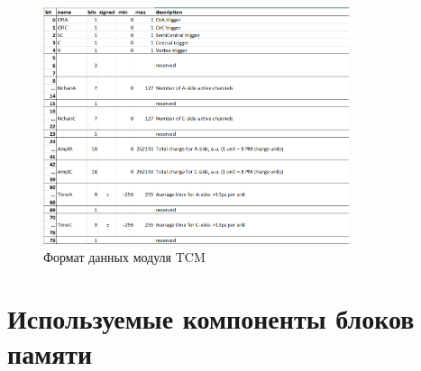 \documentclass{article}
\begin{document}
\begin{figure}[H]
	\centering 
	\includegraphics[width=0.8\textwidth]{TCM_data.png}
	\caption{\label{fig:10} Формат данных модуля TCM}
\end{figure}




\section{Используемые компоненты блоков памяти}
\end{document}
